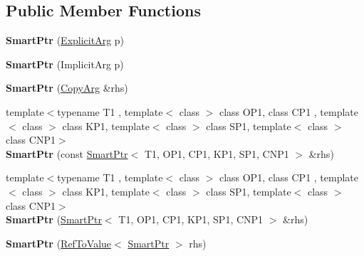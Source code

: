 \subsection*{Public Member Functions}
\begin{DoxyCompactItemize}
\item 
\hypertarget{classLoki_1_1SmartPtr_a2d27f3bcd0008d514847fbb00564997c}{}{\bfseries Smart\+Ptr} (\hyperlink{structP1}{Explicit\+Arg} p)\label{classLoki_1_1SmartPtr_a2d27f3bcd0008d514847fbb00564997c}

\item 
\hypertarget{classLoki_1_1SmartPtr_af636e3d35a3029109dfbb0e240accff6}{}{\bfseries Smart\+Ptr} (Implicit\+Arg p)\label{classLoki_1_1SmartPtr_af636e3d35a3029109dfbb0e240accff6}

\item 
\hypertarget{classLoki_1_1SmartPtr_ac6226be2cd87114118136de2e075081d}{}{\bfseries Smart\+Ptr} (\hyperlink{structP1}{Copy\+Arg} \&rhs)\label{classLoki_1_1SmartPtr_ac6226be2cd87114118136de2e075081d}

\item 
\hypertarget{classLoki_1_1SmartPtr_abcd9f9b93c73471f1e28341f80fa8335}{}{\footnotesize template$<$typename T1 , template$<$ class $>$ class O\+P1, class C\+P1 , template$<$ class $>$ class K\+P1, template$<$ class $>$ class S\+P1, template$<$ class $>$ class C\+N\+P1$>$ }\\{\bfseries Smart\+Ptr} (const \hyperlink{classLoki_1_1SmartPtr}{Smart\+Ptr}$<$ T1, O\+P1, C\+P1, K\+P1, S\+P1, C\+N\+P1 $>$ \&rhs)\label{classLoki_1_1SmartPtr_abcd9f9b93c73471f1e28341f80fa8335}

\item 
\hypertarget{classLoki_1_1SmartPtr_a94f63aadf23d86afbbdacf1d6fe6cac1}{}{\footnotesize template$<$typename T1 , template$<$ class $>$ class O\+P1, class C\+P1 , template$<$ class $>$ class K\+P1, template$<$ class $>$ class S\+P1, template$<$ class $>$ class C\+N\+P1$>$ }\\{\bfseries Smart\+Ptr} (\hyperlink{classLoki_1_1SmartPtr}{Smart\+Ptr}$<$ T1, O\+P1, C\+P1, K\+P1, S\+P1, C\+N\+P1 $>$ \&rhs)\label{classLoki_1_1SmartPtr_a94f63aadf23d86afbbdacf1d6fe6cac1}

\item 
\hypertarget{classLoki_1_1SmartPtr_afedab27e4ba97da76f6b3b78eb5ae5ca}{}{\bfseries Smart\+Ptr} (\hyperlink{classLoki_1_1RefToValue}{Ref\+To\+Value}$<$ \hyperlink{classLoki_1_1SmartPtr}{Smart\+Ptr} $>$ rhs)\label{classLoki_1_1SmartPtr_afedab27e4ba97da76f6b3b78eb5ae5ca}


\end{DoxyCompactItemize}
